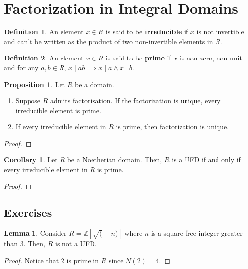 \documentclass{article}
\theoremstyle{definition}
\newtheorem{definition}{Definition}
\newtheorem{lemma}[theorem]{Lemma}
\newtheorem{corollary}{Corollary}[theorem]
\newtheorem{proposition}[theorem]{Proposition}
\newcommand{\Z}{\mathbb{Z}}
\begin{document}
\newpage

\section{Factorization in Integral Domains}

\begin{definition}
    An element $x \in R$ is said to be \textbf{irreducible} if $x$ is not invertible and can't be written as the product of two non-invertible elements in $R$.
\end{definition}

\begin{definition}
    An element $x \in R$ is said to be \textbf{prime} if $x$ is non-zero, non-unit and for any $a,b \in R$, $x \mid ab \implies x \mid a \wedge x \mid b$.
\end{definition}

\begin{proposition}
    Let $R$ be a domain.
    \begin{enumerate}
        \item Suppose $R$ admits factorization. If the factorization is unique, every irreducible element is prime.
        \item If every irreducible element in $R$ is prime, then factorization is unique.
    \end{enumerate}
\end{proposition}
\begin{proof}
    
\end{proof}


\begin{corollary}
    Let $R$ be a Noetherian domain. Then, $R$ is a UFD if and only if every irreducible element in $R$ is prime.
\end{corollary}
\begin{proof}
    
\end{proof}

\subsection{Exercises}

\begin{lemma}
    Consider $R = \Z[\sqrt(-n)]$ where $n$ is a square-free integer greater than 3.
    Then, $R$ is not a UFD.
\end{lemma}
\begin{proof}
    Notice that 2 is prime in $R$ since $N(2) = 4$. 
\end{proof}
\end{document}
